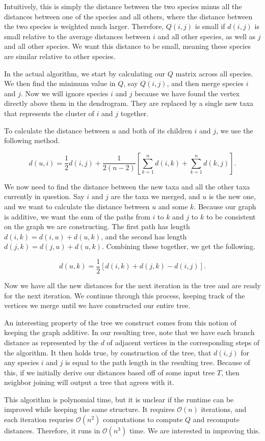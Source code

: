 Intuitively, this is simply the distance between the two species minus all the distances between one of the species and all others, where the distance between the two species is weighted much larger. Therefore, $Q(i,j)$ is small if $d(i,j)$ is small relative to the average distances between $i$ and all other species, as well as $j$ and all other species. We want this distance to be small, meaning these species are similar relative to other species.

In the actual algorithm, we start by calculating our $Q$ matrix across all species. We then find the minimum value in $Q$, say $Q(i,j)$, and then merge species $i$ and $j$. Now we will ignore species $i$ and $j$ because we have found the vertex directly above them in the dendrogram. They are replaced by a single new taxa that represents the cluster of $i$ and $j$ together.

To calculate the distance between $u$ and both of its children $i$ and $j$, we use the following method.

\[d(u,i) = \frac12d(i,j) + \frac1{2(n-2)} \left[\sum_{k=1}^n d(i,k) + \sum_{k=1}^n d(k,j)\right].\]

We now need to find the distance between the new taxa and all the other taxa currently in question. Say $i$ and $j$ are the taxa we merged, and $u$ is the new one, and we want to calculate the distance between $u$ and some $k$. Because our graph is additive, we want the sum of the paths from $i$ to $k$ and $j$ to $k$ to be consistent on the graph we are constructing. The first path has length $d(i,k) = d(i,u) + d(u,k)$, and the second has length $d(j,k) = d(j,u) + d(u,k)$. Combining these together, we get the following.

\[d(u,k) = \frac12[d(i,k) + d(j,k) - d(i,j)].\]

Now we have all the new distances for the next iteration in the tree and are ready for the next iteration. We continue through this process, keeping track of the vertices we merge until we have constructed our entire tree.

An interesting property of the tree we construct comes from this notion of keeping the graph additive. In our resulting tree, note that we have each branch distance as represented by the $d$ of adjacent vertices in the corresponding steps of the algorithm. It then holds true, by construction of the tree, that $d(i,j)$ for any species $i$ and $j$ is equal to the path length in the resulting tree. Because of this, if we initially derive our distances based off of some input tree $T$, then neighbor joining will output a tree that agrees with it.

This algorithm is polynomial time, but it is unclear if the runtime can be improved while keeping the same structure. It requires $\mathcal{O}(n)$ iterations, and each iteration requries $\mathcal{O}(n^2)$ computations to compute $Q$ and recompute distances. Therefore, it runs in $\mathcal{O}(n^3)$ time. We are interested in improving this.


